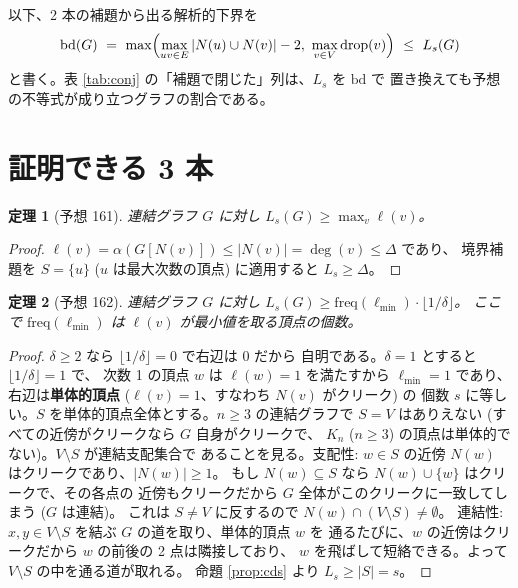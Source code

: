 \documentclass[paper=a4,fontsize=10.5pt,jafontsize=10.5pt]{jlreq}
\theoremstyle{plain}
\newtheorem{theorem}{定理}[section]
\theoremstyle{definition}
\begin{document}
以下、2 本の補題から出る解析的下界を
\begin{equation}\label{eq:bd}
\mathrm{bd}(G) \ = \ \max\Bigl(
  \max_{uv \in E} |N(u) \cup N(v)| - 2, \ \max_{v \in V} \mathrm{drop}(v)
\Bigr) \ \le \ L_s(G)
\end{equation}
と書く。表 \ref{tab:conj} の「補題で閉じた」列は、$L_s$ を $\mathrm{bd}$ で
置き換えても予想の不等式が成り立つグラフの割合である。

\section{証明できる 3 本}\label{sec:proofs}

\begin{theorem}[予想 161]\label{thm:161}
連結グラフ $G$ に対し $L_s(G) \ge \max_v \ell(v)$。
\end{theorem}

\begin{proof}
$\ell(v) = \alpha(G[N(v)]) \le |N(v)| = \deg(v) \le \Delta$ であり、
境界補題を $S = \{u\}$ ($u$ は最大次数の頂点) に適用すると
$L_s \ge \Delta$。
\end{proof}

\begin{theorem}[予想 162]\label{thm:162}
連結グラフ $G$ に対し
$L_s(G) \ge \mathrm{freq}(\ell_{\min}) \cdot \lfloor 1/\delta \rfloor$。
ここで $\mathrm{freq}(\ell_{\min})$ は $\ell(v)$ が最小値を取る頂点の個数。
\end{theorem}

\begin{proof}
$\delta \ge 2$ なら $\lfloor 1/\delta \rfloor = 0$ で右辺は 0 だから
自明である。$\delta = 1$ とすると $\lfloor 1/\delta \rfloor = 1$ で、
次数 1 の頂点 $w$ は $\ell(w) = 1$ を満たすから $\ell_{\min} = 1$ であり、
右辺は\textbf{単体的頂点} ($\ell(v) = 1$、すなわち $N(v)$ がクリーク) の
個数 $s$ に等しい。$S$ を単体的頂点全体とする。$n \ge 3$ の連結グラフで
$S = V$ はありえない (すべての近傍がクリークなら $G$ 自身がクリークで、
$K_n$ ($n \ge 3$) の頂点は単体的でない)。$V \setminus S$ が連結支配集合で
あることを見る。支配性: $w \in S$ の近傍 $N(w)$ はクリークであり、$|N(w)| \ge 1$。
もし $N(w) \subseteq S$ なら $N(w) \cup \{w\}$ はクリークで、その各点の
近傍もクリークだから $G$ 全体がこのクリークに一致してしまう ($G$ は連結)。
これは $S \ne V$ に反するので $N(w) \cap (V \setminus S) \ne \emptyset$。
連結性: $x, y \in V \setminus S$ を結ぶ $G$ の道を取り、単体的頂点 $w$ を
通るたびに、$w$ の近傍はクリークだから $w$ の前後の 2 点は隣接しており、
$w$ を飛ばして短絡できる。よって $V \setminus S$ の中を通る道が取れる。
命題 \ref{prop:cds} より $L_s \ge |S| = s$。
\end{proof}
\end{document}
